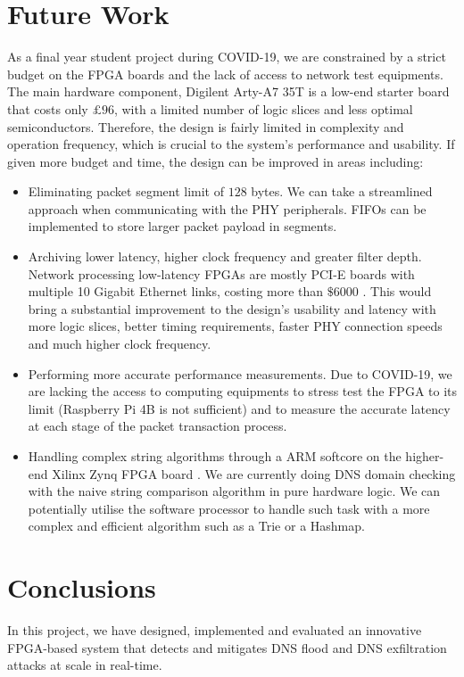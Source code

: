 \documentclass[a4paper]{report}
\begin{document}
\section{Future Work}

As a final year student project during COVID-19, we are constrained by a strict budget on the FPGA boards and the lack of access to network test equipments. The main hardware component, Digilent Arty-A7 35T is a low-end starter board that costs only $£96$, with a limited number of logic slices and less optimal semiconductors. Therefore, the design is fairly limited in complexity and operation frequency, which is crucial to the system's performance and usability. If given more budget and time, the design can be improved in areas including:

\begin{itemize}
    \item Eliminating packet segment limit of $128$ bytes. We can take a streamlined approach when communicating with the PHY peripherals. FIFOs can be implemented to store larger packet payload in segments.
    \item Archiving lower latency, higher clock frequency and greater filter depth. Network processing low-latency FPGAs are mostly PCI-E boards with multiple 10 Gigabit Ethernet links, costing more than $\$6000$ \cite{netfpga-sume-digilent}. This would bring a substantial improvement to the design's usability and latency with more logic slices, better timing requirements, faster PHY connection speeds and much higher clock frequency.
    \item Performing more accurate performance measurements. Due to COVID-19, we are lacking the access to computing equipments to stress test the FPGA to its limit (Raspberry Pi 4B is not sufficient) and to measure the accurate latency at each stage of the packet transaction process.
    \item Handling complex string algorithms through a ARM softcore on the higher-end Xilinx Zynq FPGA board \cite{zynq-7000-xilinx}. We are currently doing DNS domain checking with the naive string comparison algorithm in pure hardware logic. We can potentially utilise the software processor to handle such task with a more complex and efficient algorithm such as a Trie or a Hashmap.
\end{itemize}

\section{Conclusions}
In this project, we have designed, implemented and evaluated an innovative FPGA-based system that detects and mitigates DNS flood and DNS exfiltration attacks at scale in real-time.
\end{document}

